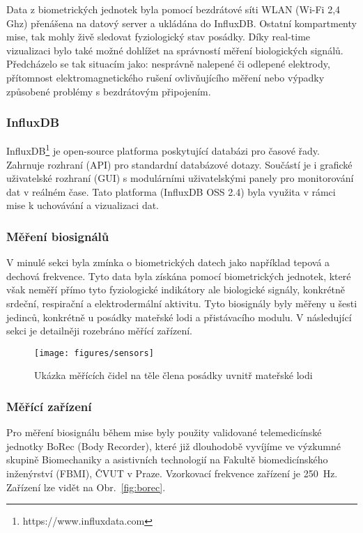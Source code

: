 Data z biometrických jednotek byla pomocí bezdrátové síti WLAN (Wi-Fi 2,4 Ghz)
přenášena na datový server a ukládána do InfluxDB. Ostatní kompartmenty mise,
tak mohly živě sledovat fyziologický stav posádky. Díky real-time vizualizaci
bylo také možné dohlížet na správností měření biologických signálů. Předcházelo
se tak situacím jako: nesprávně nalepené či odlepené elektrody, přítomnost
elektromagnetického rušení ovlivňujícího měření nebo výpadky způsobené problémy
s bezdrátovým připojením.

\subsubsection{InfluxDB}
\label{subsec:influx}
InfluxDB\footnote{https://www.influxdata.com} je open-source platforma
poskytující databázi pro časové řady. Zahrnuje rozhraní (API) pro standardní
databázové dotazy. Součástí je i grafické uživatelské rozhraní (GUI) s
modulárními uživatelskými panely pro monitorování dat v reálném čase. Tato
platforma (InfluxDB OSS 2.4) byla využita v rámci mise k uchovávání a
vizualizaci dat.

\subsubsection{Měření biosignálů}
\label{subsubsec:mereni_biosignalu}
V minulé sekci byla zmínka o biometrických datech jako například tepová a
dechová frekvence. Tyto data byla získána pomocí biometrických jednotek, které
však neměří přímo tyto fyziologické indikátory ale biologické signály, konkrétně
srdeční, respirační a elektrodermální aktivitu. Tyto biosignály byly měřeny u
šesti jedinců, konkrétně u posádky mateřské lodi a přistávacího modulu. V
následující sekci je detailněji rozebráno měřící zařízení.

\begin{figure}[h]
    \begin{center}
        \texttt{[image: figures/sensors]}
        \caption{Ukázka měřících čidel na těle člena posádky uvnitř mateřské lodi}
        \label{fig:sensors}
    \end{center}
\end{figure}

\subsubsection{Měřící zařízení}
\label{subsubsec:merici_zarizeni}
Pro měření biosignálu během mise byly použity validované telemedicínské jednotky
BoRec (Body Recorder), které již dlouhodobě vyvíjíme ve výzkumné skupině
Biomechaniky a asistivních technologií na Fakultě biomedicínského inženýrství
(\gls{FBMI}), ČVUT v Praze. Vzorkovací frekvence zařízení je 250~Hz. Zařízení
lze vidět na Obr.~\ref{fig:borec}.

